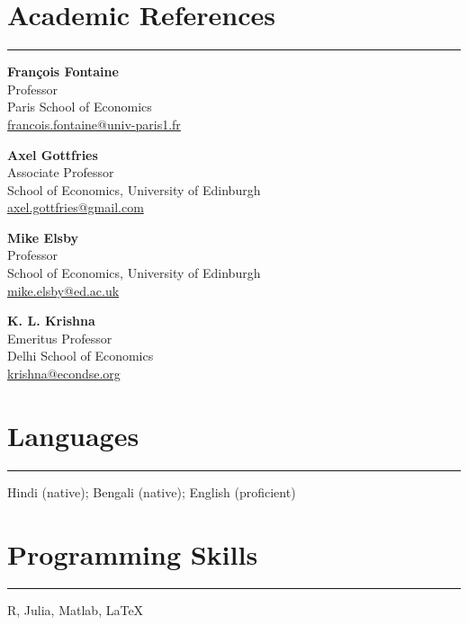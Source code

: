 \documentclass[11pt,a4paper]{article}
\begin{document}
\section*{Academic References}
\vspace{-0.5em}
\hrule
\vspace{1em}
\noindent
\begin{minipage}[t]{0.48\textwidth}
  \centering
  \textbf{François Fontaine}\\
  Professor\\
  Paris School of Economics\\
  \href{mailto:francois.fontaine@univ-paris1.fr}{francois.fontaine@univ-paris1.fr}
  
  \vspace{1.5em} %
  
  \textbf{Axel Gottfries}\\
  Associate Professor\\
  School of Economics, University of Edinburgh\\
  \href{mailto:axel.gottfries@gmail.com}{axel.gottfries@gmail.com}
\end{minipage}\hfill
\begin{minipage}[t]{0.48\textwidth}
  \centering
  \textbf{Mike Elsby}\\
  Professor\\
  School of Economics, University of Edinburgh\\
  \href{mailto:mike.elsby@ed.ac.uk}{mike.elsby@ed.ac.uk}

  \vspace{1.5em}

  \textbf{K. L. Krishna}\\
  Emeritus Professor\\
  Delhi School of Economics\\
  \href{mailto:krishna@econdse.org}{krishna@econdse.org}
\end{minipage}

\section*{Languages}
\vspace{-0.5em}
\hrule
\vspace{0.5em}
Hindi (native); Bengali (native); English (proficient)

\section*{Programming Skills}
\vspace{-0.5em}
\hrule
\vspace{0.5em}
R, Julia, Matlab, \LaTeX
\end{document}
